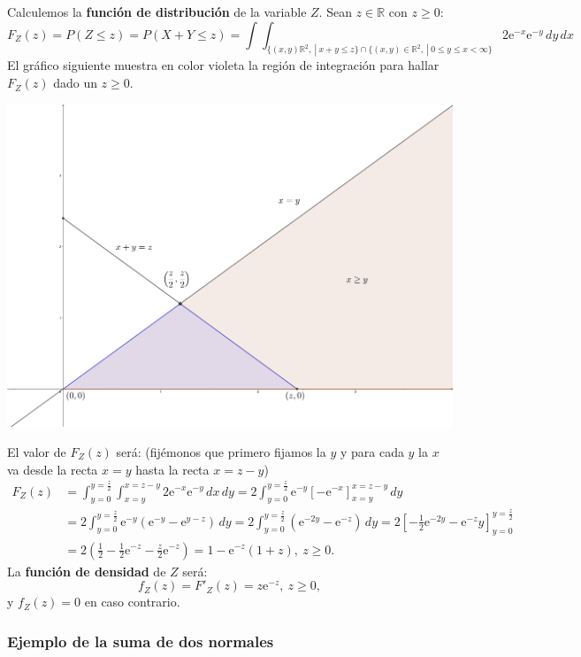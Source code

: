 \documentclass[]{book}
\begin{document}
Calculemos la \textbf{función de distribución} de la variable \(Z\). Sean \(z\in\mathbb{R}\) con \(z\geq 0\):
\[
F_Z(z)=P(Z\leq z)=P(X+Y\leq z)=\int\int_{\{(x,y)\mathbb{R}^2,\ |\ x+y\leq z\}\cap \{(x,y)\in \mathbb{R}^2,\ |\ 0\leq y\leq x<\infty\}} 2 \mathrm{e}^{-x}\mathrm{e}^{-y}\, dy\, dx
\]
El gráfico siguiente muestra en color violeta la región de integración para hallar \(F_Z(z)\) dado un \(z\geq 0\).

\includegraphics{Images/EjSumaXY.png}

El valor de \(F_Z(z)\) será: (fijémonos que primero fijamos la \(y\) y para cada \(y\) la \(x\) va desde la recta \(x=y\) hasta la recta \(x=z-y\))
\[
\begin{array}{rl}
F_Z(z) & =\int_{y=0}^{y=\frac{z}{2}}\int_{x=y}^{x=z-y}2 \mathrm{e}^{-x}\mathrm{e}^{-y}\, dx\, dy = 2 \int_{y=0}^{y=\frac{z}{2}} \mathrm{e}^{-y} \left[-\mathrm{e}^{-x}\right]_{x=y}^{x=z-y}\, dy \\ & = 2 \int_{y=0}^{y=\frac{z}{2}} \mathrm{e}^{-y} \left(\mathrm{e}^{-y}-\mathrm{e}^{y-z}\right)\, dy = 2 \int_{y=0}^{y=\frac{z}{2}} \left(\mathrm{e}^{-2y}-\mathrm{e}^{-z} \right)\, dy  = 2\left[-\frac{1}{2}\mathrm{e}^{-2y}-\mathrm{e}^{-z} y\right]_{y=0}^{y=\frac{z}{2}} \\ & = 2\left(\frac{1}{2}-\frac{1}{2}\mathrm{e}^{-z}-\frac{z}{2}\mathrm{e}^{-z}\right) = 1-\mathrm{e}^{-z}(1+z),\ z\geq 0.
\end{array}
\]
La \textbf{función de densidad} de \(Z\) será:
\[
f_Z(z)=F'_Z(z)=z \mathrm{e}^{-z},\ z\geq 0,
\]
y \(f_Z(z)=0\) en caso contrario.

\hypertarget{ejemplo-de-la-suma-de-dos-normales}{%
\subsubsection{Ejemplo de la suma de dos normales}\label{ejemplo-de-la-suma-de-dos-normales}}
\end{document}
